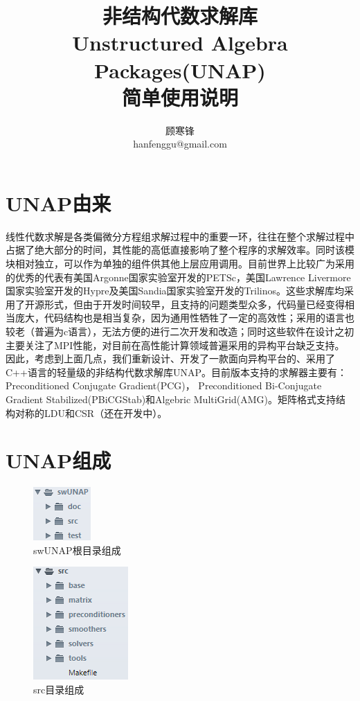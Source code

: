 \documentclass{ctexart}
\title{非结构代数求解库 \\
	   \textbf{Un}structured \textbf{A}lgebra \textbf{P}ackages(\textbf{UNAP}) \\
	   简单使用说明}
\author{顾寒锋 \\
		hanfenggu@gmail.com}
\begin{document}
\fancyhf{}
\pagestyle{fancy}
\fancyhead[R]{\leftmark}
\fancyfoot[R]{\thepage $\slash$ \pageref{LastPage}}
\renewcommand{\headrulewidth}{0.4pt}
\renewcommand{\footrulewidth}{0.4pt}


\maketitle

\section{UNAP由来}
线性代数求解是各类偏微分方程组求解过程中的重要一环，往往在整个求解过程中占据了绝大部分的时间，其性能的高低直接影响了整个程序的求解效率。同时该模块相对独立，可以作为单独的组件供其他上层应用调用。目前世界上比较广为采用的优秀的代表有美国Argonne国家实验室开发的PETSc，美国Lawrence Livermore国家实验室开发的Hypre及美国Sandia国家实验室开发的Trilinos。这些求解库均采用了开源形式，但由于开发时间较早，且支持的问题类型众多，代码量已经变得相当庞大，代码结构也是相当复杂，因为通用性牺牲了一定的高效性；采用的语言也较老（普遍为c语言），无法方便的进行二次开发和改造；同时这些软件在设计之初主要关注了MPI性能，对目前在高性能计算领域普遍采用的异构平台缺乏支持。\\

因此，考虑到上面几点，我们重新设计、开发了一款面向异构平台的、采用了C++语言的轻量级的非结构代数求解库UNAP。目前版本支持的求解器主要有：Preconditioned Conjugate Gradient(PCG)， Preconditioned Bi-Conjugate Gradient Stabilized(PBiCGStab)和Algebric MultiGrid(AMG)。矩阵格式支持结构对称的LDU和CSR（还在开发中）。

\section{UNAP组成}

\begin{figure}[htbp]
\centerline{\includegraphics{unap_dir.png}}
\caption{swUNAP根目录组成}
\label{fig:unap_dir}
\end{figure}

\begin{figure}[htbp]
\centerline{\includegraphics{src_dir.png}}
\caption{src目录组成}
\label{fig:src_dir}
\end{figure}
\end{document}
